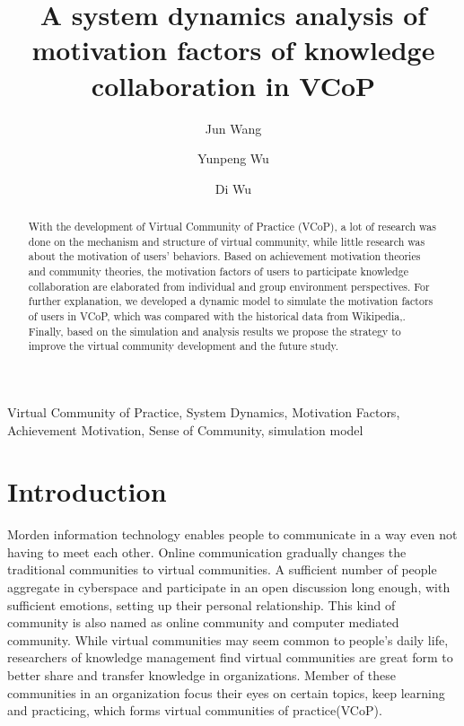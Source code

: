 \documentclass{elsarticle}
\begin{document}
\begin{frontmatter}
\title{A system dynamics analysis of motivation factors of knowledge collaboration in VCoP}
\author[buaa]{Jun Wang}

\author[buaa]{Yunpeng Wu}

\author[buaa]{Di Wu}

\address[buaa]{School of Economics and Management, Beihang University, 
Beijing 100083, P.R. China}

\begin{abstract}
 With the development of Virtual Community of Practice (VCoP), a lot of research was done on the mechanism and structure of virtual community, while little research was about the motivation of users’ behaviors. Based on achievement motivation theories and community theories, the motivation factors of users to participate knowledge collaboration are elaborated from individual and group environment perspectives. For further explanation, we developed a dynamic model to simulate the motivation factors of users in VCoP, which was compared with the historical data from Wikipedia,. Finally, based on the simulation and analysis results we propose the strategy to improve the virtual community development and the future study. 

\end{abstract}

\begin{keyword}
  Virtual Community of Practice, System Dynamics, Motivation Factors, Achievement Motivation, Sense of Community, simulation model

\end{keyword}
\end{frontmatter}

\section{Introduction}
\label{sec:introduction}
Morden information technology enables people to communicate in a way
even not having to meet each other. Online communication gradually changes the
traditional communities to virtual communities.  A sufficient number of
people  aggregate in cyberspace and participate in  an open discussion
long enough, with sufficient emotions, setting up  their personal
relationship\cite{rheingold2000vch}. This kind of community is also
named as online community and computer mediated community. While
virtual communities may seem common to people's daily life,
researchers of knowledge management find virtual communities are great
form to better share and transfer knowledge in organizations. Member
of these communities in an organization focus their eyes on certain
topics, keep learning and practicing,  which forms virtual
communities of practice(VCoP). 
\end{document}
